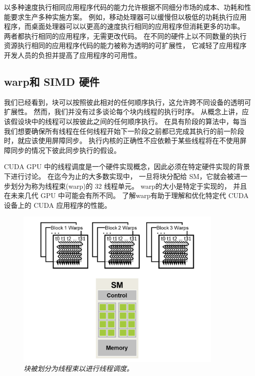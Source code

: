 以多种速度执行相同应用程序代码的能力允许根据不同细分市场的成本、功耗和性能要求生产多种实施方案。 
例如，移动处理器可以缓慢但以极低的功耗执行应用程序，而桌面处理器可以以更高的速度执行相同的应用程序但消耗更多的功率。 
两者都执行相同的应用程序，无需更改代码。 
在不同的硬件上以不同数量的执行资源执行相同的应用程序代码的能力被称为透明的可扩展性，
它减轻了应用程序开发人员的负担并提高了应用程序的可用性。

\subsection{warp和 SIMD 硬件}
我们已经看到，块可以按照彼此相对的任何顺序执行，这允许跨不同设备的透明可扩展性。 
然而，我们并没有过多谈论每个块内线程的执行时序。 从概念上讲，应该假设块中的线程可以按彼此之间的任何顺序执行。 
在具有阶段的算法中，每当我们想要确保所有线程在任何线程开始下一阶段之前都已完成其执行的前一阶段时，就应该使用屏障同步。 
执行内核的正确性不应依赖于某些线程将在不使用屏障同步的情况下彼此同步执行的假设。

CUDA GPU 中的线程调度是一个硬件实现概念，因此必须在特定硬件实现的背景下进行讨论。 在迄今为止的大多数实现中，
一旦将块分配给 SM，它就会被进一步划分为称为线程束(warp)的 32 线程单元。 warp的大小是特定于实现的，
并且在未来几代 GPU 中可能会有所不同。 了解warp有助于理解和优化特定代 CUDA 设备上的 CUDA 应用程序的性能。

\begin{figure}[H]
	\centering
	\includegraphics[width=0.9\textwidth]{figs/F4.6.png}
	\caption{\textit{块被划分为线程束以进行线程调度。}}
\end{figure}

